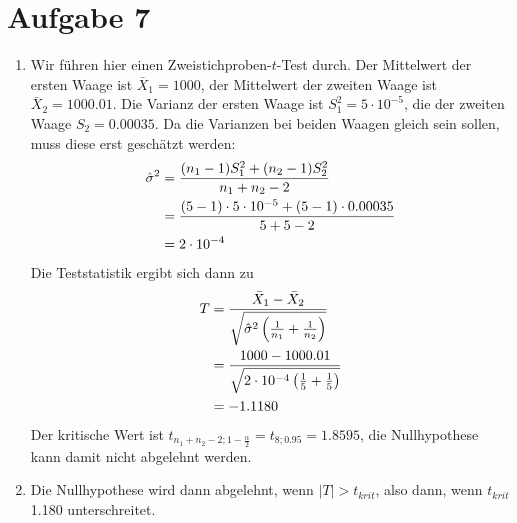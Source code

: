 \documentclass{article}
\begin{document}
	\section*{Aufgabe 7}
	\begin{enumerate}[label=(\alph*)]
		\item Wir führen hier einen Zweistichproben-$t$-Test durch. Der Mittelwert der ersten Waage ist $\bar{X}_1=1000$, der Mittelwert der zweiten Waage ist $\bar{X}_2=1000.01$. Die Varianz der ersten Waage ist $S_1^2=5\cdot 10^{-5}$, die der zweiten Waage $S_2=0.00035$. Da die Varianzen bei beiden Waagen gleich sein sollen, muss diese erst geschätzt werden:
		\begin{align}
			\hat{\sigma}^2 &= \frac{(n_1-1)S_1^2 + (n_2-1)S_2^2}{n_1+n_2-2} \notag \\
			&= \frac{(5-1)\cdot 5\cdot 10^{-5} + (5-1)\cdot 0.00035}{5+5-2} \notag \\
			&= 2\cdot 10^{-4} \notag
		\end{align}
		Die Teststatistik ergibt sich dann zu
		\begin{align}
			T &= \frac{\bar{X}_1-\bar{X}_2}{\sqrt{\hat{\sigma}^2\left(\frac{1}{n_1}+\frac{1}{n_2}\right)}} \notag \\
			&= \frac{1000-1000.01}{\sqrt{2\cdot 10^{-4}\left(\frac{1}{5}+\frac{1}{5}\right)}} \notag \\
			&= -1.1180 \notag
		\end{align}
		Der kritische Wert ist $t_{n_1+n_2-2;1-\frac{\alpha}{2}}=t_{8;0.95}=1.8595$, die Nullhypothese kann damit nicht abgelehnt werden.
		\item Die Nullhypothese wird dann abgelehnt, wenn $\vert T\vert > t_{krit}$, also dann, wenn $t_{krit}$ 1.180 unterschreitet.
	\end{enumerate}
\end{document}
